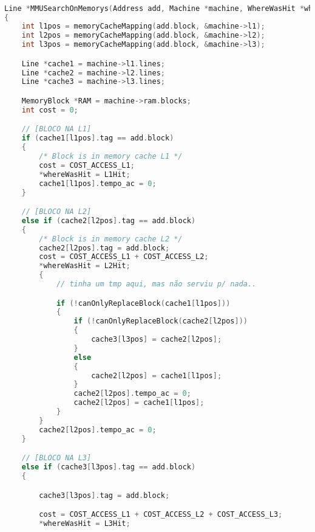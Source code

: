 \documentclass{article}
\begin{document}
\begin{lstlisting}[caption={Exemplo da função MMUSearchOnMemorys.},label={lst:cod1},language=C]

Line *MMUSearchOnMemorys(Address add, Machine *machine, WhereWasHit *whereWasHit)
{
    int l1pos = memoryCacheMapping(add.block, &machine->l1);
    int l2pos = memoryCacheMapping(add.block, &machine->l2);
    int l3pos = memoryCacheMapping(add.block, &machine->l3);

    Line *cache1 = machine->l1.lines;
    Line *cache2 = machine->l2.lines;
    Line *cache3 = machine->l3.lines;

    MemoryBlock *RAM = machine->ram.blocks;
    int cost = 0;

    // [BLOCO NA L1]
    if (cache1[l1pos].tag == add.block)
    {
        /* Block is in memory cache L1 */
        cost = COST_ACCESS_L1;
        *whereWasHit = L1Hit;
        cache1[l1pos].tempo_ac = 0;
    }

    // [BLOCO NA L2]
    else if (cache2[l2pos].tag == add.block)
    {
        /* Block is in memory cache L2 */
        cache2[l2pos].tag = add.block;
        cost = COST_ACCESS_L1 + COST_ACCESS_L2;
        *whereWasHit = L2Hit;
        {
            // tinha um tmp aqui, mas não serviu p/ nada..

            if (!canOnlyReplaceBlock(cache1[l1pos]))
            {
                if (!canOnlyReplaceBlock(cache2[l2pos]))
                {
                    cache3[l3pos] = cache2[l2pos];
                }
                else
                {
                    cache2[l2pos] = cache1[l1pos];
                }
                cache2[l2pos].tempo_ac = 0;
                cache2[l2pos] = cache1[l1pos];
            }
        }
        cache2[l2pos].tempo_ac = 0;
    }

    // [BLOCO NA L3]
    else if (cache3[l3pos].tag == add.block)
    {

        cache3[l3pos].tag = add.block;

        cost = COST_ACCESS_L1 + COST_ACCESS_L2 + COST_ACCESS_L3;
        *whereWasHit = L3Hit;


\end{lstlisting}
\end{document}
